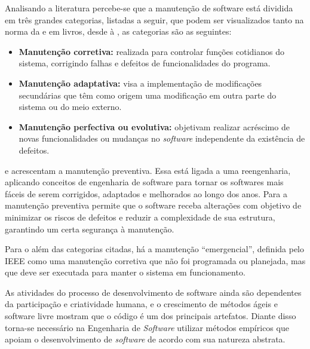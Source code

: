 
Analisando a literatura percebe-se que a manutenção de software está dividida em três grandes categorias, listadas a seguir, que podem ser visualizados tanto na norma da  e em livros, desde  à , as categorias são as seguintes:
\begin{itemize}
\item \textbf{Manutenção corretiva:} realizada para controlar funções cotidianos do sistema, corrigindo falhas e defeitos de funcionalidades do programa.

\item \textbf{Manutenção adaptativa:} visa a implementação de modificações secundárias que têm como origem uma modificação em outra parte do sistema ou do meio externo.

\item \textbf{Manutenção perfectiva ou evolutiva:} objetivam realizar acréscimo de novas funcionalidades ou mudanças no \textit{software} independente da existência de defeitos.
\end{itemize}

 e  acrescentam a manutenção preventiva. Essa está ligada a uma reengenharia, aplicando conceitos de engenharia de software para tornar os softwares mais fáceis de serem corrigidos, adaptados e melhorados ao longo dos anos. Para  a manutenção preventiva permite que o software receba alterações com objetivo de minimizar os riscos de defeitos e reduzir a complexidade de sua estrutura, garantindo um certa segurança à manutenção.


Para o  além das categorias citadas, há a manutenção ``emergencial'', definida pelo IEEE como uma manutenção corretiva que não foi programada ou planejada, mas que deve ser executada para manter o sistema em funcionamento.

As atividades do processo de desenvolvimento de software ainda são dependentes da participação e criatividade humana, e o crescimento de métodos ágeis e software livre mostram que o código é um dos principais artefatos. Diante disso torna-se necessário na Engenharia de \textit{Software} utilizar métodos empíricos que apoiam o desenvolvimento de \textit{software} de acordo com sua natureza abstrata.

